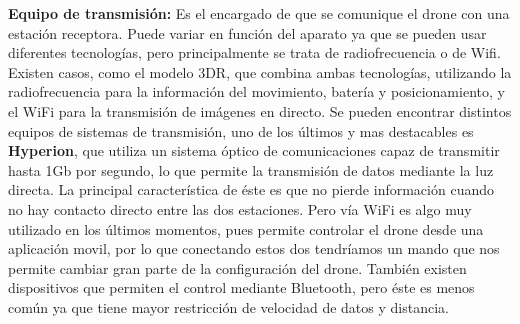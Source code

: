 \hspace{1 cm}\textbf{Equipo de transmisi\'on:} Es el encargado de que se comunique el drone con una estaci\'on receptora. Puede variar en funci\'on del aparato ya que se pueden usar diferentes tecnolog\'ias, pero principalmente se trata de radiofrecuencia o de Wifi. Existen casos, como el modelo 3DR, que combina ambas tecnolog\'ias, utilizando la radiofrecuencia para la informaci\'on del movimiento, bater\'ia y posicionamiento, y el WiFi para la transmisi\'on de im\'agenes en directo. Se pueden encontrar distintos equipos de sistemas de transmisi\'on, uno de los \'ultimos y mas destacables es \textbf{Hyperion}, que utiliza un sistema \'optico de comunicaciones capaz de transmitir hasta 1Gb por segundo, lo que permite la transmisi\'on de datos mediante la luz directa. La principal caracter\'istica de \'este es que no pierde informaci\'on cuando no hay contacto directo entre las dos estaciones. Pero v\'ia WiFi es algo muy utilizado en los \'ultimos momentos, pues permite controlar el drone desde una aplicaci\'on movil, por lo que conectando estos dos tendr\'iamos un mando que nos permite cambiar gran parte de la configuraci\'on del drone. Tambi\'en existen dispositivos que permiten el control mediante Bluetooth, pero \'este es menos com\'un ya que tiene mayor restricci\'on de velocidad de datos y distancia. 


